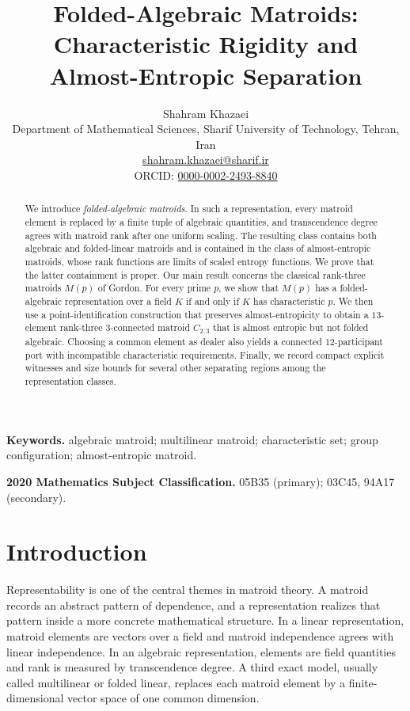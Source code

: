 \documentclass[11pt]{article}
\title{\textbf{Folded-Algebraic Matroids: Characteristic Rigidity and Almost-Entropic Separation}}
\author{Shahram Khazaei\\
\small Department of Mathematical Sciences, Sharif University of Technology, Tehran, Iran\\
\small \href{mailto:shahram.khazaei@sharif.ir}{shahram.khazaei@sharif.ir}\\
\small ORCID: \href{https://orcid.org/0000-0002-2493-8840}{0000-0002-2493-8840}}
\date{}
\theoremstyle{definition}
\begin{document}
\maketitle

\begin{abstract}
We introduce \emph{folded-algebraic matroids}.  In such a representation, every matroid element is replaced by a finite tuple of algebraic quantities, and transcendence degree agrees with matroid rank after one uniform scaling.  The resulting class contains both algebraic and folded-linear matroids and is contained in the class of almost-entropic matroids, whose rank functions are limits of scaled entropy functions.  We prove that the latter containment is proper.  Our main result concerns the classical rank-three matroids $M(p)$ of Gordon.  For every prime $p$, we show that $M(p)$ has a folded-algebraic representation over a field $K$ if and only if $K$ has characteristic $p$.  We then use a point-identification construction that preserves almost-entropicity to obtain a $13$-element rank-three $3$-connected matroid $C_{2,3}$ that is almost entropic but not folded algebraic.  Choosing a common element as dealer also yields a connected $12$-participant port with incompatible characteristic requirements.  Finally, we record compact explicit witnesses and size bounds for several other separating regions among the representation classes.
\end{abstract}

\noindent\textbf{Keywords.} algebraic matroid; multilinear matroid; characteristic set; group configuration; almost-entropic matroid.

\noindent\textbf{2020 Mathematics Subject Classification.} 05B35 (primary); 03C45, 94A17 (secondary).

\section{Introduction}\label{sec:intro}

Representability is one of the central themes in matroid theory.  A matroid records an abstract pattern of dependence, and a representation realizes that pattern inside a more concrete mathematical structure.  In a linear representation, matroid elements are vectors over a field and matroid independence agrees with linear independence.  In an algebraic representation, elements are field quantities and rank is measured by transcendence degree.  A third exact model, usually called multilinear or folded linear, replaces each matroid element by a finite-dimensional vector space of one common dimension.
\end{document}
